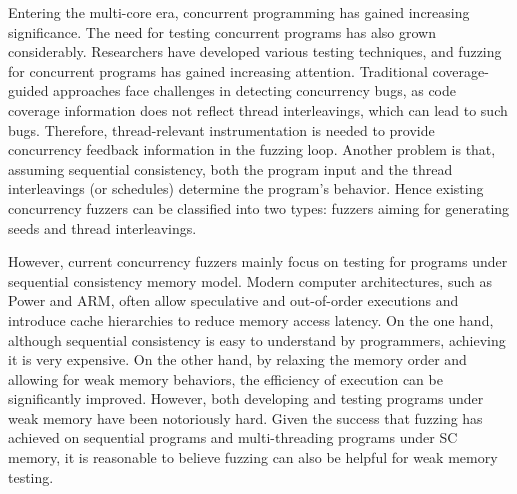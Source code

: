 



Entering the multi-core era, concurrent programming has gained increasing significance. The need for testing concurrent programs has also grown considerably. Researchers have developed various testing techniques, and fuzzing for concurrent programs has gained increasing attention. Traditional coverage-guided approaches face challenges in detecting concurrency bugs, as code coverage information does not reflect thread interleavings, which can lead to such bugs. Therefore, thread-relevant instrumentation is needed to provide concurrency feedback information in the fuzzing loop. Another problem is that, assuming sequential consistency, both the program input and the thread interleavings (or schedules) determine the program's behavior. Hence existing concurrency fuzzers can be classified into two types: fuzzers aiming for generating seeds\cite{muzz} and thread interleavings\cite{rff, conzzer}.

However, current concurrency fuzzers mainly focus on testing for programs under sequential consistency memory model. Modern computer architectures, such as Power\cite{Power} and ARM\cite{arm, ARMv8}, often allow speculative and out-of-order executions and introduce cache hierarchies to reduce memory access latency. On the one hand, although sequential consistency is easy to understand by programmers, achieving it is very expensive. On the other hand, by relaxing the memory order and allowing for weak memory behaviors, the efficiency of execution can be significantly improved. However, both developing and testing programs under weak memory have been notoriously hard. Given the success that fuzzing has achieved on sequential programs and multi-threading programs under SC memory, it is reasonable to believe fuzzing can also be helpful for weak memory testing. 

